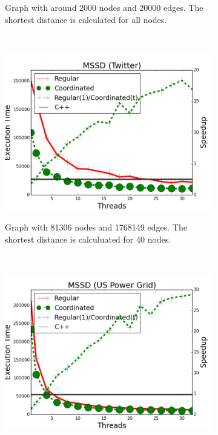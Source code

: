 \begin{figure}[]
\begin{subfigure}[b]{\plotsize\textwidth}
                \label{fig:coordination:coord_sssp_oclinks}
                \caption{Graph with around 2000 nodes and 20000 edges. The shortest
                   distance is calculated for all nodes.}
        \end{subfigure} \\
        \begin{subfigure}[b]{\plotsize\textwidth}
                \includegraphics[width=\textwidth]{experiments/coordination/cmp-shortest-twitter.png}
                \label{fig:coordination:coord_sssp_twitter}
                \caption{Graph with 81306 nodes and 1768149 edges. The shortest
                   distance is calculuated for 40 nodes.}
        \end{subfigure}
        ~
        \begin{subfigure}[b]{\plotsize\textwidth}
                \includegraphics[width=\textwidth]{experiments/coordination/cmp-shortest-uspowergrid.png}

\end{subfigure}
\end{figure}
